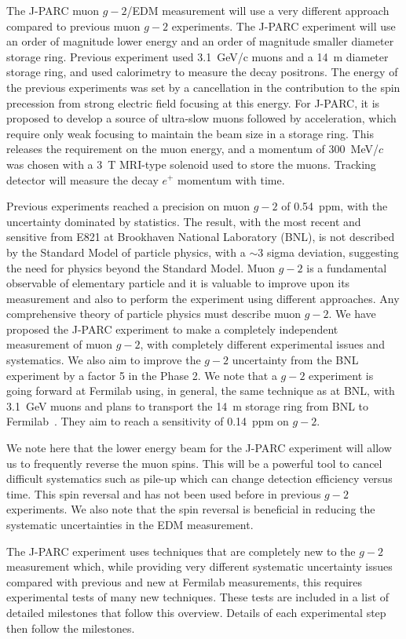The J-PARC muon $g-2$/EDM  measurement will use a very different 
approach compared to previous muon $g-2$ experiments.  The J-PARC
experiment will use an order of magnitude lower energy and an order of 
magnitude smaller diameter storage ring.  Previous experiment used 3.1~GeV/c
muons and a 14~m diameter storage ring, and
used calorimetry to measure the decay positrons.  The energy of the
previous experiments was set by a cancellation in the contribution to the 
spin precession from strong electric field focusing at this energy.  For
J-PARC, it is proposed to develop a source of ultra-slow muons followed by
acceleration, which require
only weak focusing to maintain the beam size in a storage ring.  This releases
the requirement on the muon energy, and a momentum 
of 300~MeV/$c$ was chosen with a 3~T
MRI-type solenoid used to store the muons.  Tracking detector will measure the 
decay $e^{+}$ momentum with time.

Previous experiments reached a precision on muon $g-2$ of 
0.54~ppm, with the uncertainty dominated by statistics.  The 
result, with the most recent and sensitive from E821 at Brookhaven National
Laboratory (BNL), is not described by the Standard Model of particle 
physics, with a $\sim$3 sigma deviation, suggesting the need for physics 
beyond the Standard Model.  
Muon $g-2$ is a fundamental observable of elementary particle and it is 
valuable to improve upon its
measurement and also to perform the experiment using different approaches.  
Any comprehensive theory of particle physics must describe muon $g-2$.  
We have proposed the J-PARC experiment to make a completely independent
measurement of muon $g-2$, with completely different experimental 
issues and systematics.  We also aim to improve the $g-2$ uncertainty 
from the BNL experiment by a factor 5 in the Phase 2. We note that a $g-2$ experiment 
is going forward at Fermilab using, in general, the same technique as at 
BNL, with 3.1~GeV muons and plans to transport the 14~m storage ring from 
BNL to Fermilab~\cite{FNAL_E989_TDR}. They aim to reach a sensitivity of 0.14~ppm on $g-2$.

We note here that the lower energy beam for the J-PARC experiment will
allow us to frequently reverse the muon spins.  This will be a powerful
tool to cancel difficult systematics such as pile-up which can change
detection efficiency versus time.  This spin reversal and has not been used 
before in previous $g-2$ experiments.  We also note that the spin reversal is beneficial 
in reducing the systematic uncertainties in the EDM measurement. 

The J-PARC experiment uses techniques that are completely new to the $g-2$
measurement which, while providing very different systematic uncertainty
issues compared with previous and new at Fermilab measurements, this
requires experimental tests of many new techniques. 
These tests are included in a list of detailed milestones that follow this
overview.  Details of each experimental step then follow the milestones.
